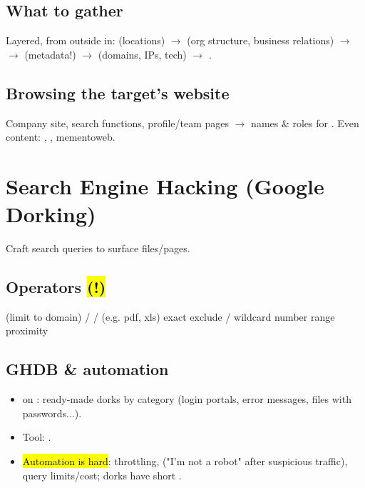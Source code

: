 \subsection{What to gather}
Layered, from outside in:  (locations) $\to$  (org structure, business relations) $\to$  $\to$  (metadata!) $\to$  (domains, IPs, tech) $\to$ .

\subsection{Browsing the target's website}
Company site, search functions, profile/team pages $\to$ names \& roles for . Even  content: , , mementoweb.

\section{Search Engine Hacking (Google Dorking)}
Craft search queries to surface  files/pages. 

\subsection{Operators \hl{(!)}}
{\scriptsize
{} (limit to domain) \textbullet{}  /  \textbullet{}  /  \textbullet{}  \textbullet{}  (e.g. pdf, xls) \textbullet{}  \textbullet{}  \textbullet{}  exact \textbullet{} \kw{-} exclude \textbullet{}  / \kw{|} \textbullet{} \kw{*} wildcard \textbullet{}  number range \textbullet{}  proximity
}

\subsection{GHDB \& automation}
\begin{itemize}
\item {} on : ready-made dorks by category (login portals, error messages, files with passwords...).
\item Tool: .
\item \hl{Automation is hard}: throttling,  ("I'm not a robot" after suspicious traffic), query limits/cost; dorks have short .
\end{itemize}

